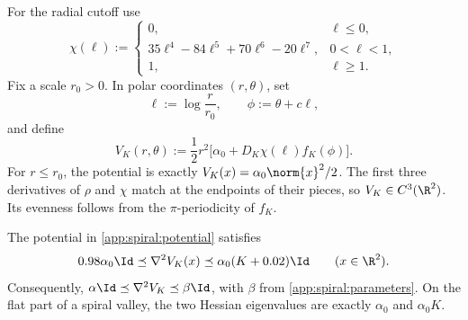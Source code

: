 For the radial cutoff use
\begin{equation}
\label{app:spiral:radial-cutoff}
    \chi(\ell):=
    \begin{cases}
        0, & \ell\leq0,\\
        35\ell^4-84\ell^5+70\ell^6-20\ell^7,
            & 0<\ell<1,\\
        1, & \ell\geq1.
    \end{cases}
\end{equation}
Fix a scale \(r_0>0\).  In polar coordinates \((r,\theta)\), set
\[
    \ell:=\log\frac r{r_0},
    \qquad
    \phi:=\theta+c\ell,
\]
and define
\begin{equation}
\label{app:spiral:potential}
    \boxed{
    V_K(r,\theta)
    :=\frac12r^2\bigl[\alpha_0+D_K\chi(\ell)f_K(\phi)\bigr].}
\end{equation}
For \(r\leq r_0\), the potential is exactly
\(V_K(x)=\alpha_0\norm{x}^2/2\).  The first three derivatives of \(\rho\) and
\(\chi\) match at the endpoints of their pieces, so
\(V_K\in C^3(\R^2)\).  Its evenness follows from the \(\pi\)-periodicity of
\(f_K\).

\begin{lemma}
\label{app:spiral:hessian-certificate}
The potential in \eqref{app:spiral:potential} satisfies
\begin{equation}
\label{app:spiral:hessian-bounds}
    0.98\alpha_0\Id\preceq\nabla^2V_K(x)\preceq \alpha_0(K+0.02)\Id
    \qquad (x\in\R^2).
\end{equation}
Consequently,
\(\alpha\Id\preceq\nabla^2V_K\preceq\beta\Id\), with \(\beta\) from
\eqref{app:spiral:parameters}.  On the flat part of a spiral valley, the
two Hessian eigenvalues are exactly \(\alpha_0\) and \(\alpha_0K\).
\end{lemma}

